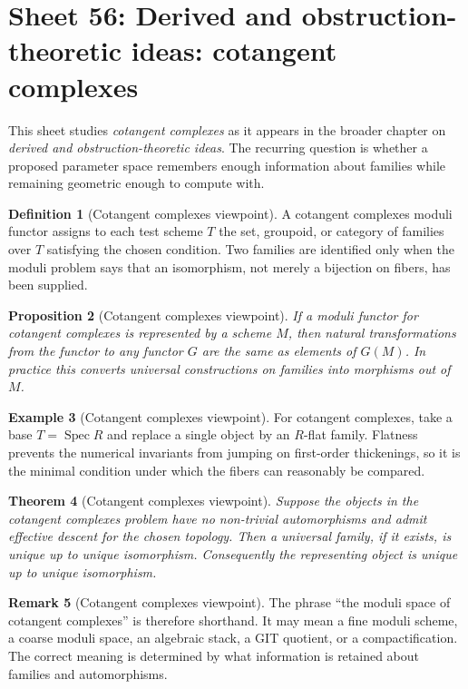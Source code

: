\documentclass[11pt]{amsart}
\newtheorem{theorem}{Theorem}[section]
\newtheorem{proposition}[theorem]{Proposition}
\theoremstyle{definition}
\newtheorem{definition}[theorem]{Definition}
\newtheorem{example}[theorem]{Example}
\newtheorem{remark}[theorem]{Remark}
\newcommand{\Spec}{\operatorname{Spec}}
\begin{document}
\section{Sheet 56: Derived and obstruction-theoretic ideas: cotangent complexes}
This sheet studies \emph{cotangent complexes} as it appears in the broader chapter on \emph{derived and obstruction-theoretic ideas}.  The recurring question is whether a proposed parameter space remembers enough information about families while remaining geometric enough to compute with.
\begin{definition}[Cotangent complexes viewpoint]
A cotangent complexes moduli functor assigns to each test scheme $T$ the set, groupoid, or category of families over $T$ satisfying the chosen condition.  Two families are identified only when the moduli problem says that an isomorphism, not merely a bijection on fibers, has been supplied.
\end{definition}
\begin{proposition}[Cotangent complexes viewpoint]
If a moduli functor for cotangent complexes is represented by a scheme $M$, then natural transformations from the functor to any functor $G$ are the same as elements of $G(M)$.  In practice this converts universal constructions on families into morphisms out of $M$.
\end{proposition}
\begin{example}[Cotangent complexes viewpoint]
For cotangent complexes, take a base $T=\Spec R$ and replace a single object by an $R$-flat family.  Flatness prevents the numerical invariants from jumping on first-order thickenings, so it is the minimal condition under which the fibers can reasonably be compared.
\end{example}
\begin{theorem}[Cotangent complexes viewpoint]
Suppose the objects in the cotangent complexes problem have no non-trivial automorphisms and admit effective descent for the chosen topology.  Then a universal family, if it exists, is unique up to unique isomorphism.  Consequently the representing object is unique up to unique isomorphism.
\end{theorem}
\begin{remark}[Cotangent complexes viewpoint]
The phrase ``the moduli space of cotangent complexes'' is therefore shorthand.  It may mean a fine moduli scheme, a coarse moduli space, an algebraic stack, a GIT quotient, or a compactification.  The correct meaning is determined by what information is retained about families and automorphisms.
\end{remark}
\end{document}
